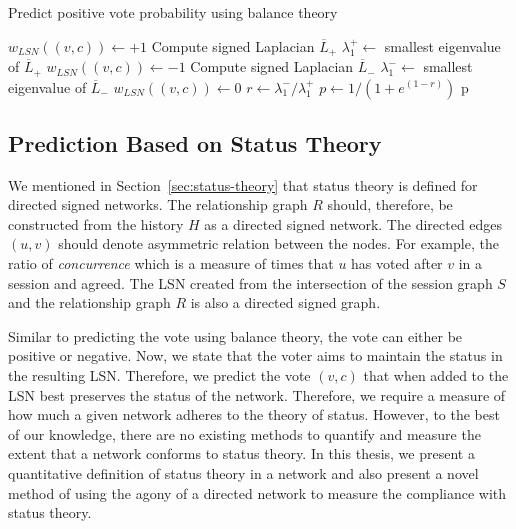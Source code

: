 

\begin{algorithm}[htp]
    \DontPrintSemicolon
    \caption{Predict positive vote probability using balance theory}
    \label{alg:balance-pred}
    $w_{LSN}((v,c)) \leftarrow +1$ 
    Compute signed Laplacian $\overline{L}_+$\;
    $\lambda_1^+ \leftarrow $ smallest eigenvalue of $\overline{L}_+$\;
    $w_{LSN}((v,c)) \leftarrow -1$  
    Compute signed Laplacian $\overline{L}_-$\;
    $\lambda_{1}^- \leftarrow$ smallest eigenvalue of $\overline{L}_-$\;
    $w_{LSN}((v,c)) \leftarrow 0$ 
    $r \leftarrow {\lambda_{1}^-}/{\lambda_{1}^{+}}$\;
    $p \leftarrow 1/(1+e^{(1-r)})$\;
    \Return p
\end{algorithm}

\subsection{Prediction Based on Status Theory }
\label{subsec:prediction-based-status}
We mentioned in Section~\ref{sec:status-theory} that status theory is defined for directed signed networks.
The relationship graph $R$ should, therefore, be constructed from the history $H$ as a directed signed network.
The directed edges $(u,v)$ should denote asymmetric relation between the nodes.
For example, the ratio of \textit{concurrence} which is a measure of times that $u$ has voted after $v$ in a session and agreed.
The LSN created from the intersection of the session graph $S$ and the relationship graph $R$ is also a directed signed graph.

Similar to predicting the vote using balance theory, the vote can either be positive or negative.
Now, we state that the voter aims to maintain the status in the resulting LSN.
Therefore, we predict the vote $(v,c)$ that when added to the LSN best preserves the status of the network.
Therefore, we require a measure of how much a given network adheres to the theory of status.
However, to the best of our knowledge, there are no existing methods to quantify and measure the extent that a network conforms to status theory.
In this thesis, we present a quantitative definition of status theory in a network and also present a novel method of using the agony of a directed network to measure the compliance with status theory.

